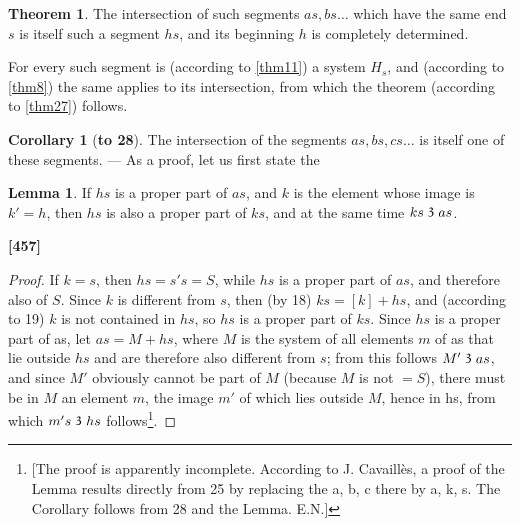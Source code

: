 \documentclass[leqno]{article}
\theoremstyle{definition}
\newtheorem{theorem}{Theorem}
\newtheorem*{corollary}{Corollary}
\newtheorem*{lemma}{Lemma}
\newcommand\partof{\mathrel{\raisebox{0.45ex}{$\mathfrak{3}$}}}
\begin{document}
\begin{theorem}\label{thm28}
The intersection of such segments $as, bs\ldots$ which have the same end $s$ is itself such a segment $hs$, and its beginning $h$ is completely determined.
\end{theorem}

For every such segment is (according to \ref{thm11}) a system $H_s$, and (according to \ref{thm8}) the same applies to its intersection, from which the theorem (according to \ref{thm27}) follows.

\begin{corollary}[\textbf{to 28}]
\label{cor_to_thm28}
The intersection of the segments $as, bs, cs \ldots$ is itself one of these segments. --- As a proof, let us first state the 
\end{corollary}

\begin{lemma}
If $hs$ is a proper part of $as$, and $k$ is the element whose image is $k'=h$, then $hs$ is also a proper part of $ks$, and at the same time $ks \partof as$.
\end{lemma}
\noindent \textbf{[457]}

\begin{proof}
If $k=s$, then $hs=s's= S$, while $hs$ is a proper part of $as$, and therefore also of $S$. Since $k$ is different from $s$, then (by 18) $ks =[k]+ hs$, and (according to 19) $k$ is not contained in $hs$, so $hs$ is a proper part of $ks$. 
Since $hs$ is a proper part of as, let $as = M + hs$, where $M$ is the system of all elements $m$ of as that lie outside $hs$ and are therefore also different from $s$; from this follows $M' \partof as$, and since $M'$ obviously cannot be part of $M$ (because $M$ is not $= S$), there must be in $M$ an element $m$, the image $m'$ of which lies outside $M$, hence in hs, from which $m's \partof hs$ follows\footnote{[The proof is apparently incomplete. According to J. Cavaillès, a proof of the Lemma results directly from 25 by replacing the a, b, c there by a, k, s. The Corollary follows from 28 and the Lemma. E.N.]}.\end{proof}
\end{document}
